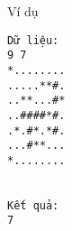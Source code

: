 Ví dụ
\begin{verbatim}
Dữ liệu:
9 7
*........
.....**#.
..**...#*
..####*#.
.*.#*.*#.
...#**...
*........


Kết quả:
7


\end{verbatim}
